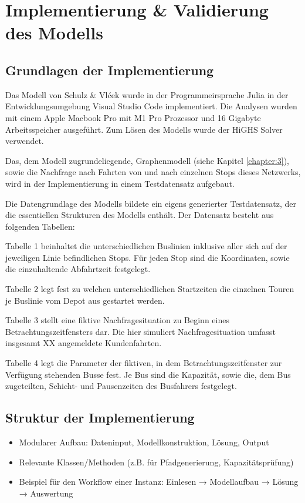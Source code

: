 \chapter{Implementierung \& Validierung des Modells}
\section{Grundlagen der Implementierung}
Das Modell von Schulz \& Vlćek wurde in der Programmeirsprache Julia in der Entwicklungsumgebung Visual Studio Code implementiert. Die Analysen wurden mit einem Apple Macbook Pro mit M1 Pro Prozessor und 16 Gigabyte Arbeitsspeicher ausgeführt. Zum Lösen des Modells wurde der HiGHS Solver verwendet. 

Das, dem Modell zugrundeliegende, Graphenmodell (siehe Kapitel \ref{chapter:3}), sowie die Nachfrage nach Fahrten von und nach einzelnen Stops dieses Netzwerks, wird in der Implementierung in einem Testdatensatz aufgebaut. %

Die Datengrundlage des Modells bildete ein eigens generierter Testdatensatz, der die essentiellen Strukturen des Modells enthält. Der Datensatz besteht aus folgenden Tabellen:

Tabelle 1 beinhaltet die unterschiedlichen Buslinien inklusive aller sich auf der jeweiligen Linie befindlichen Stops. Für jeden Stop sind die Koordinaten, sowie die einzuhaltende Abfahrtzeit festgelegt. 

Tabelle 2 legt fest zu welchen unterschiedlichen Startzeiten die einzelnen Touren je Buslinie vom Depot aus gestartet werden. 

Tabelle 3 stellt eine fiktive Nachfragesituation zu Beginn eines Betrachtungszeitfensters dar. Die hier simuliert Nachfragesituation umfasst insgesamt XX angemeldete Kundenfahrten. 

Tabelle 4 legt die Parameter der fiktiven, in dem Betrachtungszeitfenster zur Verfügung stehenden Busse fest. Je Bus sind die Kapazität, sowie die, dem Bus zugeteilten, Schicht- und Pausenzeiten des Busfahrers festgelegt.

\section{Struktur der Implementierung}
\begin{itemize}
    \item Modularer Aufbau: Dateninput, Modellkonstruktion, Lösung, Output
    \item Relevante Klassen/Methoden (z.B. für Pfadgenerierung, Kapazitätsprüfung)
    \item Beispiel für den Workflow einer Instanz: Einlesen → Modellaufbau → Lösung → Auswertung
\end{itemize}

